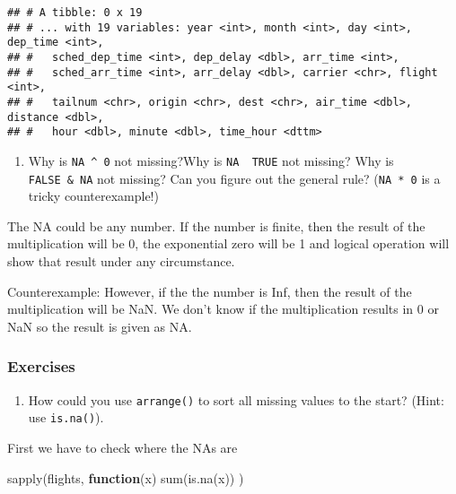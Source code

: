 \documentclass[
]{article}
\newenvironment{Shaded}{\begin{snugshade}}{\end{snugshade}}
\newcommand{\ControlFlowTok}[1]{\textcolor[rgb]{0.13,0.29,0.53}{\textbf{#1}}}
\newcommand{\FunctionTok}[1]{\textcolor[rgb]{0.00,0.00,0.00}{#1}}
\newcommand{\NormalTok}[1]{#1}
\providecommand{\tightlist}{%
  \setlength{\itemsep}{0pt}\setlength{\parskip}{0pt}}
\begin{document}
\begin{verbatim}
## # A tibble: 0 x 19
## # ... with 19 variables: year <int>, month <int>, day <int>, dep_time <int>,
## #   sched_dep_time <int>, dep_delay <dbl>, arr_time <int>,
## #   sched_arr_time <int>, arr_delay <dbl>, carrier <chr>, flight <int>,
## #   tailnum <chr>, origin <chr>, dest <chr>, air_time <dbl>, distance <dbl>,
## #   hour <dbl>, minute <dbl>, time_hour <dttm>
\end{verbatim}

\begin{enumerate}
\def\labelenumi{\arabic{enumi}.}
\setcounter{enumi}{3}
\tightlist
\item
  Why is \texttt{NA\ \^{}\ 0} not missing?Why is
  \texttt{NA\ \textbar{}\ TRUE} not missing? Why is
  \texttt{FALSE\ \&\ NA} not missing? Can you figure out the general
  rule? (\texttt{NA\ *\ 0} is a tricky counterexample!)
\end{enumerate}

The NA could be any number. If the number is finite, then the result of
the multiplication will be 0, the exponential zero will be 1 and logical
operation will show that result under any circumstance.

Counterexample: However, if the the number is Inf, then the result of
the multiplication will be NaN. We don't know if the multiplication
results in 0 or NaN so the result is given as NA.

\hypertarget{exercises-1}{%
\subsubsection{Exercises}\label{exercises-1}}

\begin{enumerate}
\def\labelenumi{\arabic{enumi}.}
\tightlist
\item
  How could you use \texttt{arrange()} to sort all missing values to the
  start? (Hint: use \texttt{is.na()}).
\end{enumerate}

First we have to check where the NAs are

\begin{Shaded}
\begin{Highlighting}[]
\FunctionTok{sapply}\NormalTok{(flights, }\ControlFlowTok{function}\NormalTok{(x) }\FunctionTok{sum}\NormalTok{(}\FunctionTok{is.na}\NormalTok{(x)) )}
\end{Highlighting}
\end{Shaded}
\end{document}
